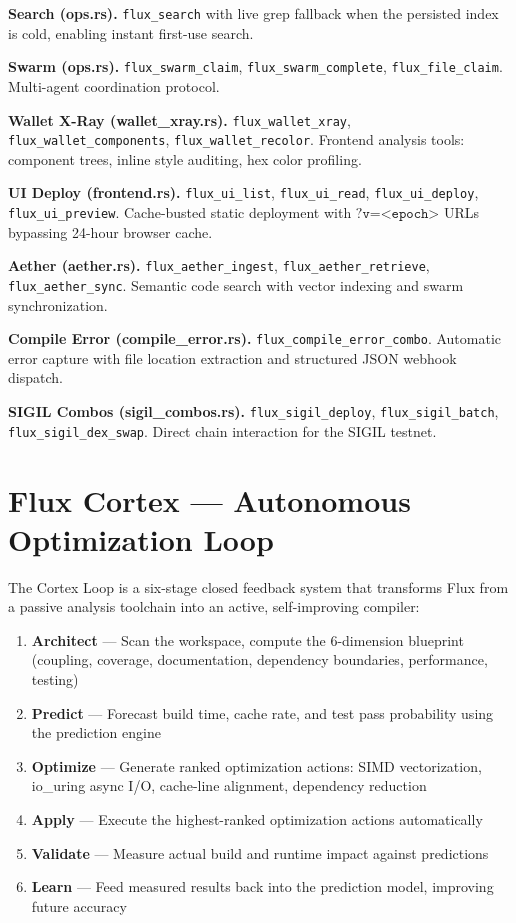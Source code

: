 \documentclass[11pt,a4paper]{article}
\begin{document}
\textbf{Search (ops.rs).} \texttt{flux\_search} with live grep fallback when the persisted index is cold, enabling instant first-use search.

\textbf{Swarm (ops.rs).} \texttt{flux\_swarm\_claim}, \texttt{flux\_swarm\_complete}, \texttt{flux\_file\_claim}. Multi-agent coordination protocol.

\textbf{Wallet X-Ray (wallet\_xray.rs).} \texttt{flux\_wallet\_xray}, \texttt{flux\_wallet\_components}, \texttt{flux\_wallet\_recolor}. Frontend analysis tools: component trees, inline style auditing, hex color profiling.

\textbf{UI Deploy (frontend.rs).} \texttt{flux\_ui\_list}, \texttt{flux\_ui\_read}, \texttt{flux\_ui\_deploy}, \texttt{flux\_ui\_preview}. Cache-busted static deployment with $\texttt{?v=<epoch>}$ URLs bypassing 24-hour browser cache.

\textbf{Aether (aether.rs).} \texttt{flux\_aether\_ingest}, \texttt{flux\_aether\_retrieve}, \texttt{flux\_aether\_sync}. Semantic code search with vector indexing and swarm synchronization.

\textbf{Compile Error (compile\_error.rs).} \texttt{flux\_compile\_error\_combo}. Automatic error capture with file location extraction and structured JSON webhook dispatch.

\textbf{SIGIL Combos (sigil\_combos.rs).} \texttt{flux\_sigil\_deploy}, \texttt{flux\_sigil\_batch}, \texttt{flux\_sigil\_dex\_swap}. Direct chain interaction for the SIGIL testnet.

\section{Flux Cortex — Autonomous Optimization Loop}

The Cortex Loop\texttrademark{} is a six-stage closed feedback system that transforms Flux from a passive analysis toolchain into an active, self-improving compiler:

\begin{enumerate}
\item \textbf{Architect} — Scan the workspace, compute the 6-dimension blueprint (coupling, coverage, documentation, dependency boundaries, performance, testing)
\item \textbf{Predict} — Forecast build time, cache rate, and test pass probability using the prediction engine
\item \textbf{Optimize} — Generate ranked optimization actions: SIMD vectorization, io\_uring async I/O, cache-line alignment, dependency reduction
\item \textbf{Apply} — Execute the highest-ranked optimization actions automatically
\item \textbf{Validate} — Measure actual build and runtime impact against predictions
\item \textbf{Learn} — Feed measured results back into the prediction model, improving future accuracy
\end{enumerate}
\end{document}
